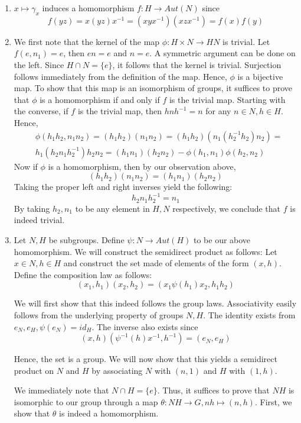 \documentclass[Lang.tex]{subfiles}
\begin{document}
\begin{enumerate}
\item $x \mapsto \gamma_x$ induces a homomorphism $f: H \rightarrow Aut(N)$ since $$f(yz) = x(yz)x^{-1} = (xyx^{-1})(xzx^{-1}) = f(x)f(y)$$
\item 
We first note that the kernel of the map $\phi: H \times N \rightarrow HN$ is trivial. Let $f(e,n_1) = e$, then
$en = e$ and $n = e$. A symmetric argument can be done on the left. Since $H \cap N = \{e\}$, it follows that the kernel is trivial. Surjection follows immediately from the definition of the map. Hence, $\phi$ is a bijective map. To show that this map is an isomorphism of groups, it suffices to prove that $\phi$ is a homomorphism if and only if $f$ is the trivial map. Starting with the converse, if $f$ is the trivial map, then $hnh^{-1} = n$ for any $n \in N, h \in H$. Hence,
\begin{align*}
     & \phi(h_1h_2,n_1n_2) = (h_1h_2)(n_1n_2) = (h_1h_2)(n_1 (h_2^{-1}h_2) n_2) = \\
     &h_1 (h_2n_1h_2^{-1})h_2 n_2 = (h_1n_1)(h_2n_2) - \phi(h_1,n_1)\phi(h_2,n_2)
\end{align*}
Now if $\phi$ is a homomorphism, then by our observation above,
$$  (h_1h_2)(n_1n_2) = (h_1n_1)(h_2n_2)  $$
Taking the proper left and right inverses yield the following:
$$ h_2 n_1 h_2^{-1} = n_1 $$
By taking $h_2,n_1$ to be any element in $H,N$ respectively, we conclude that $f$ is indeed trivial.
\item
Let $N,H$ be subgroups. Define $\psi: N \rightarrow Aut(H)$ to be our above homomorphism. We will construct the semidirect product as follows: Let $x \in N, h \in H$ and construct the set made of elements of the form $(x,h)$. Define the composition law as follows:
$$ (x_1,h_1)(x_2,h_2) = (x_1\psi(h_1) x_2, h_1h_2)$$

We will first show that this indeed follows the group laws. Associativity easily follows from the underlying property of groups $N,H$. The identity exists from $e_N,e_H,\psi(e_N) = id_H$. The inverse also exists since $$(x,h)(\psi^{-1}(h)x^{-1},h^{-1}) = (e_N,e_H)$$

Hence, the set is a group. We will now show that this yields a semidirect product on $N$ and $H$ by associating $N$ with $(n,1)$ and $H$ with $(1,h)$. 

We immediately note that $N \cap H = \{ e\}$. Thus, it suffices to prove that $NH$ is isomorphic to our group through a map $\theta: NH \rightarrow G, nh \mapsto (n,h)$. First, we show that $\theta$ is indeed a homomorphism. 


\end{enumerate}
\end{document}
